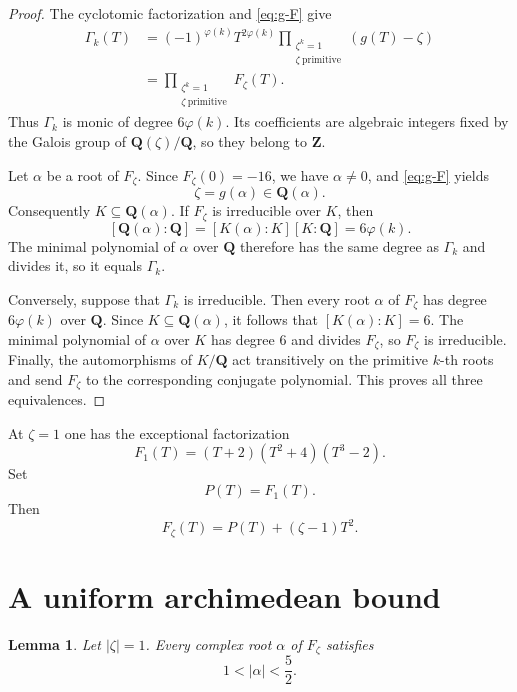 \documentclass[11pt]{article}
\newtheorem{lemma}[theorem]{Lemma}
\newcommand{\Q}{\mathbf Q}
\newcommand{\Z}{\mathbf Z}
\begin{document}
\begin{proof}
The cyclotomic factorization and \eqref{eq:g-F} give
\begin{align*}
 \Gamma_k(T)
 &=(-1)^{\varphi(k)}T^{2\varphi(k)}
   \prod_{\substack{\zeta^k=1\\\zeta\ \mathrm{primitive}}}
   (g(T)-\zeta)  \\
 &=\prod_{\substack{\zeta^k=1\\\zeta\ \mathrm{primitive}}}
   F_\zeta(T).
\end{align*}
Thus $\Gamma_k$ is monic of degree $6\varphi(k)$.  Its coefficients are
algebraic integers fixed by the Galois group of $\Q(\zeta)/\Q$, so they
belong to $\Z$.

Let $\alpha$ be a root of $F_\zeta$.  Since $F_\zeta(0)=-16$, we have
$\alpha\neq0$, and \eqref{eq:g-F} yields
\[
 \zeta=g(\alpha)\in\Q(\alpha).
\]
Consequently $K\subseteq\Q(\alpha)$.  If $F_\zeta$ is irreducible over
$K$, then
\[
 [\Q(\alpha):\Q]=[K(\alpha):K][K:\Q]=6\varphi(k).
\]
The minimal polynomial of $\alpha$ over $\Q$ therefore has the same
degree as $\Gamma_k$ and divides it, so it equals $\Gamma_k$.

Conversely, suppose that $\Gamma_k$ is irreducible.  Then every root
$\alpha$ of $F_\zeta$ has degree $6\varphi(k)$ over $\Q$.  Since
$K\subseteq\Q(\alpha)$, it follows that $[K(\alpha):K]=6$.  The minimal
polynomial of $\alpha$ over $K$ has degree $6$ and divides $F_\zeta$, so
$F_\zeta$ is irreducible.  Finally, the automorphisms of $K/\Q$ act
transitively on the primitive $k$-th roots and send $F_\zeta$ to the
corresponding conjugate polynomial.  This proves all three equivalences.
\end{proof}

At $\zeta=1$ one has the exceptional factorization
\begin{equation}\label{eq:P-factor}
 F_1(T)=(T+2)(T^2+4)(T^3-2).
\end{equation}
Set
\[
 P(T)=F_1(T).
\]
Then
\begin{equation}\label{eq:perturbation}
 F_\zeta(T)=P(T)+(\zeta-1)T^2.
\end{equation}

\section{A uniform archimedean bound}

\begin{lemma}\label{lem:annulus}
Let $|\zeta|=1$.  Every complex root $\alpha$ of $F_\zeta$ satisfies
\[
 1<|\alpha|<\frac52.
\]
\end{lemma}
\end{document}

